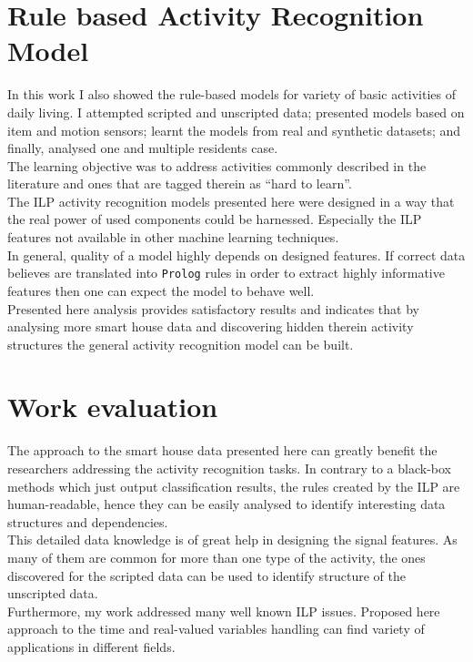 \documentclass[10pt, a4paper, pdflatex, leqno, twoside, openright]{report}
\begin{document}
  \section{Rule based Activity Recognition Model}
In this work I also showed the rule-based models for variety of basic activities of daily living. I attempted scripted and unscripted data; presented models based on item and motion sensors; learnt the models from real and synthetic datasets; and finally, analysed one and multiple residents case.\\
The learning objective was to address activities commonly described in the literature and ones that are tagged therein as ``hard to learn''.\\

The ILP activity recognition models presented here were designed in a way that the real power of used components could be harnessed. Especially the ILP features not available in other machine learning techniques.\\
In general, quality of a model highly depends on designed features. If correct data believes are translated into \texttt{Prolog} rules in order to extract highly informative features then one can expect the model to behave well.\\
Presented here analysis provides satisfactory results and indicates that by analysing more smart house data and discovering hidden therein activity structures the general activity recognition model can be built.

  \section{Work evaluation} %
The approach to the smart house data presented here can greatly benefit the researchers addressing the activity recognition tasks. In contrary to a black-box methods which just output classification results, the rules created by the ILP are human-readable, hence they can be easily analysed to identify interesting data structures and dependencies.\\
This detailed data knowledge is of great help in designing the signal features. As many of them are common for more than one type of the activity, the ones discovered for the scripted data can be used to identify structure of the unscripted data.\\

Furthermore, my work addressed many well known ILP issues. Proposed here approach to the time and real-valued variables handling can find variety of applications in different fields.\\
\end{document}
